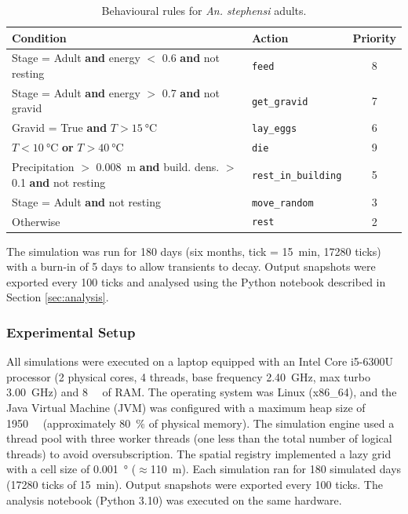 \documentclass{article}
\begin{document}
\begin{table}[!htb]
\centering
\caption{Behavioural rules for \textit{An. stephensi} adults.}
\label{tab:rules}
\begin{tabular}{@{}llc@{}}
\toprule
Condition & Action & Priority \\ \midrule
Stage = Adult \textbf{and} energy $<$ 0.6 \textbf{and} not resting & \texttt{feed} & 8 \\
Stage = Adult \textbf{and} energy $>$ 0.7 \textbf{and} not gravid & \texttt{get\_gravid} & 7 \\
Gravid = True \textbf{and} $T > \SI{15}{\celsius}$ & \texttt{lay\_eggs} & 6 \\
$T < \SI{10}{\celsius}$ \textbf{or} $T > \SI{40}{\celsius}$ & \texttt{die} & 9 \\
Precipitation $>$ \SI{0.008}{\meter} \textbf{and} build. dens. $>$ 0.1 \textbf{and} not resting & \texttt{rest\_in\_building} & 5 \\
Stage = Adult \textbf{and} not resting & \texttt{move\_random} & 3 \\
Otherwise & \texttt{rest} & 2 \\ \bottomrule
\end{tabular}
\end{table}

The simulation was run for 180 days (six months, tick = \SI{15}{\minute}, \num{17280} ticks) with a burn-in of 5 days 
to allow transients to decay. Output snapshots were exported every 100 ticks and analysed using the Python notebook described in 
Section \ref{sec:analysis}.

\subsubsection{Experimental Setup}
All simulations were executed on a laptop equipped with an Intel Core i5-6300U processor (2 physical cores, 4 threads, base frequency 
\SI{2.40}{\giga\hertz}, max turbo \SI{3.00}{\giga\hertz}) and \SI{8}{\giga\byte} of RAM. The operating system was Linux (x86\_64), 
and the Java Virtual Machine (JVM) was configured with a maximum heap size of \SI{1950}{\mega\byte} (approximately \SI{80}{\percent} of physical memory). 
The simulation engine used a thread pool with three worker threads (one less than the total number of logical threads) to avoid 
oversubscription. The spatial registry implemented a lazy grid with a cell size of \SI{0.001}{\degree} ($\approx$\SI{110}{\meter}). 
Each simulation ran for 180 simulated days (\num{17280} ticks of \SI{15}{\minute}). Output snapshots were exported every 100 ticks. 
The analysis notebook (Python 3.10) was executed on the same hardware.
\end{document}
